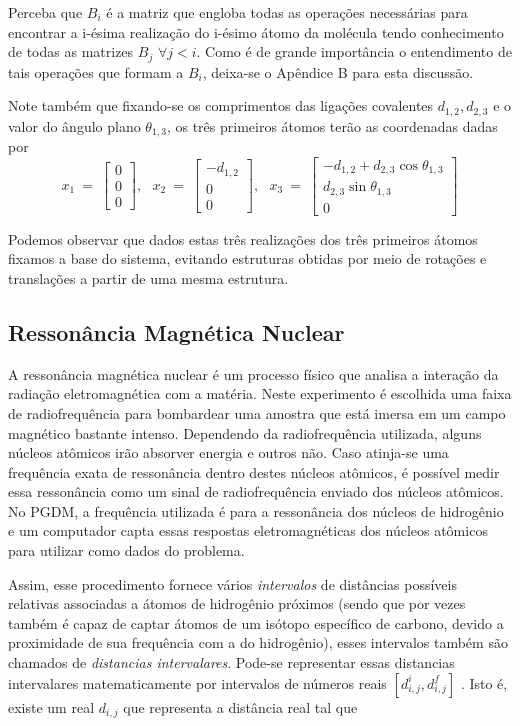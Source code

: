 \documentclass[a4paper,12pt]{article}
\begin{document}
	
	Perceba que $B_i$ é a matriz que engloba todas as operações necessárias para encontrar a i-ésima realização do i-ésimo átomo da molécula tendo conhecimento de todas as matrizes $B_j$ $\forall j < i$. Como é de grande importância o entendimento de tais operações que formam a $B_i$, deixa-se o Apêndice B para esta discussão.
	
	Note também que fixando-se os comprimentos das ligações covalentes $d_{1,2},d_{2,3}$ e o valor do ângulo plano $\theta_{1,3}$, os três primeiros átomos terão as coordenadas dadas por
	$$
	x_1\:=\:
	\begin{bmatrix}
	0\\ 
	0\\  
	0
	\end{bmatrix},\:\:\:
	x_2\:=\:
	\begin{bmatrix}
	-d_{1,2}\\ 
	0\\  
	0
	\end{bmatrix},\:\:\:
	x_3\:=\:
	\begin{bmatrix}
	-d_{1,2}+d_{2,3}\cos\theta_{1,3}\\ 
	d_{2,3}\sin\theta_{1,3}\\  
	0
	\end{bmatrix}
	$$
	
	Podemos observar que dados estas três realizações dos três primeiros átomos fixamos a base do sistema, evitando estruturas obtidas por meio de rotações e translações a partir de uma mesma estrutura.	
	
	\subsection{Ressonância Magnética Nuclear}
	A ressonância magnética nuclear é um processo físico que analisa a interação da radiação eletromagnética com a matéria. Neste experimento é escolhida uma faixa de radiofrequência para bombardear uma amostra que está imersa em um campo magnético bastante intenso. Dependendo da radiofrequência utilizada, alguns núcleos atômicos irão absorver energia e outros não. Caso atinja-se uma frequência exata de ressonância dentro destes núcleos atômicos, é possível medir essa ressonância como um sinal de radiofrequência enviado dos núcleos atômicos. No PGDM, a frequência utilizada é para a ressonância dos núcleos de hidrogênio e um computador capta essas respostas eletromagnéticas dos núcleos atômicos para utilizar como dados do problema. \cite{RMNBookIntroduction}
	
	Assim, esse procedimento fornece vários \textit{intervalos} de distâncias possíveis relativas associadas a átomos de hidrogênio próximos (sendo que por vezes também 
	é capaz de captar átomos de um isótopo específico de carbono, devido a proximidade de sua frequência com a do hidrogênio), esses intervalos também são chamados de \textit{distancias intervalares}. Pode-se representar essas distancias intervalares matematicamente por intervalos de números reais $[d_{i,j}^i, d_{i,j}^f]$ . Isto é, existe um real $d_{i,j}$ que representa a distância real tal que
	
\end{document}
